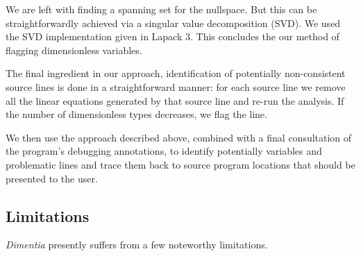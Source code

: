 \documentclass[12pt]{article}
\begin{document}
We are left with finding a spanning set for the nullspace.
But this can be straightforwardly achieved via a singular value decomposition (SVD).
We used the SVD implementation given in Lapack 3.
This concludes the our method of flagging dimensionless variables.

The final ingredient in our approach, identification of potentially non-consistent source lines is done in a straightforward manner: for each source line we remove all the linear equations generated by that source line and re-run the analysis.
If the number of dimensionless types decreases, we flag the line.

We then use the approach described above, combined with a final consultation of the program's debugging annotations, to identify potentially variables and problematic lines and trace them back to source program locations that should be presented to the user.

\subsection{Limitations}

\textit{Dimentia} presently suffers from a few noteworthy limitations.
\end{document}
